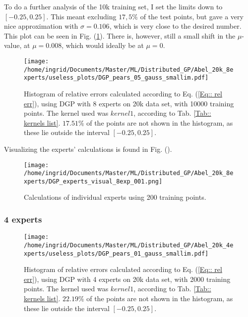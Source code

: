 \documentclass[twoside,english]{uiofysmaster}
\begin{document}
To do a further analysis of the 10k training set, I set the limits down to $[-0.25, 0.25]$. This meant excluding $17,5 \%$ of the test points, but gave a very nice approximation with $\sigma = 0.106$, which is very close to the desired number. This plot can be seen in Fig. (\ref{Fig:: DGP 20k 10000training kernel1 small lim}). There is, however, still a small shift in the $\mu$-value, at $\mu = 0.008$, which would ideally be at $\mu= 0$.

\begin{figure}
\centering
\texttt{[image: /home/ingrid/Documents/Master/ML/Distributed\_GP/Abel\_20k\_8experts/useless\_plots/DGP\_pears\_05\_gauss\_smallim.pdf]}
\caption{Histogram of relative errors calculated according to Eq. (\ref{Eq:: rel err}), using DGP with 8 experts on 20k data set, with 10000 training points. The kernel used was $kernel1$, according to Tab. \ref{Tab:: kernels list}. $17.51 \%$ of the points are not shown in the histogram, as these lie outside the interval $[-0.25, 0.25]$.}
\label{Fig:: DGP 20k 10000training kernel1 small lim}
\end{figure}
 
Visualizing the experts' calculations is found in Fig. ().

\begin{figure}
\texttt{[image: /home/ingrid/Documents/Master/ML/Distributed\_GP/Abel\_20k\_8experts/DGP\_experts\_visual\_8exp\_001.png]}
\caption{Calculations of individual experts using 200 training points.}
\label{Fig:: visualizing 8 experts 0.001}
\end{figure}
 
 
\subsubsection{4 experts} 
 
 
 
\begin{figure}
\centering
\texttt{[image: /home/ingrid/Documents/Master/ML/Distributed\_GP/Abel\_20k\_4experts/useless\_plots/DGP\_pears\_01\_gauss\_smallim.pdf]}
\caption{Histogram of relative errors calculated according to Eq. (\ref{Eq:: rel err}), using DGP with 4 experts on 20k data set, with 2000 training points. The kernel used was $kernel1$, according to Tab. \ref{Tab:: kernels list}. $22.19 \%$ of the points are not shown in the histogram, as these lie outside the interval $[-0.25, 0.25]$.}
\label{Fig:: DGP 20k 2000training kernel1}
\end{figure}  
 
\end{document}
